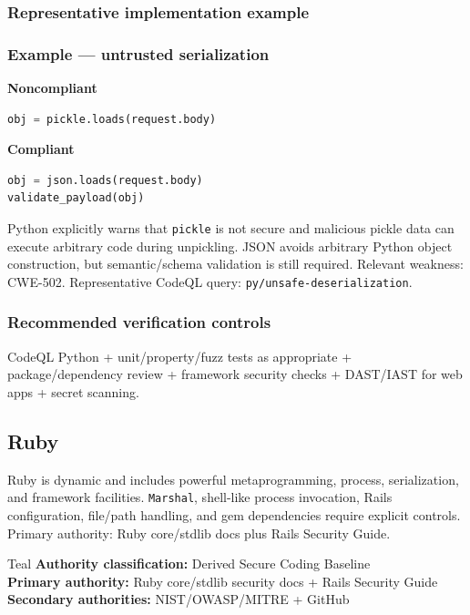 \documentclass[10pt,letterpaper]{article}
\newcommand{\code}[1]{\texttt{\small #1}}
\begin{document}
\subsubsection*{Representative implementation example}
\subsubsection*{Example --- untrusted serialization}

\textbf{Noncompliant}\par
\begin{lstlisting}[language={Python}]
obj = pickle.loads(request.body)
\end{lstlisting}

\textbf{Compliant}\par
\begin{lstlisting}[language={Python}]
obj = json.loads(request.body)
validate_payload(obj)
\end{lstlisting}

Python explicitly warns that \code{pickle} is not secure and malicious pickle data can execute arbitrary code during unpickling. JSON avoids arbitrary Python object construction, but semantic/schema validation is still required. Relevant weakness: CWE-502. Representative CodeQL query: \code{py/unsafe-deserialization}.\par
\subsubsection*{Recommended verification controls}
CodeQL Python + unit/property/fuzz tests as appropriate + package/dependency review + framework security checks + DAST/IAST for web apps + secret scanning.
\clearpage
\subsection{Ruby}
Ruby is dynamic and includes powerful metaprogramming, process, serialization, and framework facilities. \code{Marshal}, shell-like process invocation, Rails configuration, file/path handling, and gem dependencies require explicit controls. Primary authority: Ruby core/stdlib docs plus Rails Security Guide.
\begin{callout}{Teal}
\textbf{Authority classification:} Derived Secure Coding Baseline\\
\textbf{Primary authority:} Ruby core/stdlib security docs + Rails Security Guide\\
\textbf{Secondary authorities:} NIST/OWASP/MITRE + GitHub
\end{callout}
\end{document}

